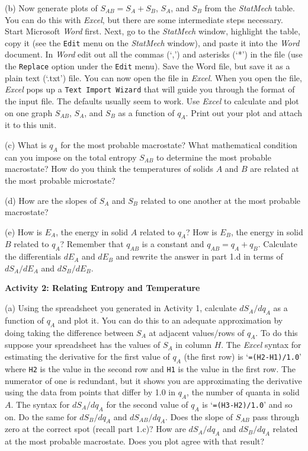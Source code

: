 (b) Now generate plots of $S_{AB}=S_A + S_B$, $S_A$, and $S_B$ from the {\it StatMech} table.
You can do this with {\it Excel}, but there are some intermediate steps necessary.
Start Microsoft {\it Word} first.
Next, go to the {\it StatMech} window, highlight the table, copy it
 (see the {\tt Edit} menu on the {\it StatMech} window), and paste it into the {\it Word}
document. 
In {\it Word} edit out all the commas (`,') and asterisks (`*') in the file 
(use the {\tt Replace}
option under the {\tt Edit} menu).
Save the Word file, but save it as a plain text (`\*.txt') file.
You can now open the file in {\it Excel}.
When you open the file, {\it Excel} pops up a {\tt Text Import Wizard} 
that will guide you through
the format of the input file.
The defaults usually seem to work.
Use {\it Excel} to calculate and plot on one graph $S_{AB}$, $S_A$, and $S_B$
as a function of $q_A$.
Print out your plot and attach it to this unit.

(c) What is $q_A$ for the most probable macrostate? What mathematical condition can you impose
on the total entropy $S_{AB}$ to determine the most probable macrostate?
How do you think the temperatures of solids $A$ and $B$ are related at the most probable 
microstate?
\vspace{15mm}

(d) How are the slopes of $S_A$ and $S_B$ related to one another at the most probable
macrostate?
\vspace{30mm}

\newpage

(e) How is $E_A$, the energy in solid $A$ related to $q_A$?
How is $E_B$, the energy in solid $B$ related to $q_A$?
Remember that $q_{AB}$ is a constant and $q_{AB} = q_A + q_B$.
Calculate the differentials $dE_A$ and $dE_B$ and rewrite the answer in part 1.d
in terms of $dS_A/dE_A$ and $dS_B/dE_B$.
\vspace{45mm}

\textbf{Activity 2: Relating Entropy and Temperature}

(a) Using the spreadsheet you generated in Activity 1, calculate $dS_A/dq_A$ as a function
of $q_A$ and plot it. You can do this to an adequate approximation
by doing taking the difference between $S_A$ at adjacent values/rows
of $q_A$.
To do this suppose your spreadsheet has the values of $S_A$ in column $H$.
The {\it Excel} syntax for estimating the derivative for the first value of
$q_A$ (the first row) is 
`{\tt =(H2-H1)/1.0}' where {\tt H2} is the value in the second row and {\tt H1} is the
value in the first row.
The numerator of one is redundant, but it shows you are approximating the derivative
using the data from points that differ by 1.0 in $q_A$, the number of quanta in solid $A$.
The syntax for $dS_A/dq_A$ for the second value of $q_A$ is `{\tt =(H3-H2)/1.0}' and so on.
Do the same for $dS_B/dq_A$ and $dS_{AB}/dq_A$.
Does the slope of $S_{AB}$ pass through zero at the correct spot (recall part 1.c)?
How are $dS_A/dq_A$ and $dS_B/dq_A$ related at the most probable macrostate.
Does you plot agree with that result?
\vspace{15mm}

